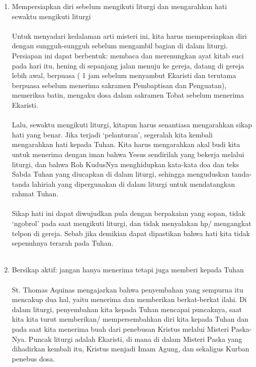 \begin{enumerate}[label=\textbf{Langkah \arabic*}]
\item Mempersiapkan diri sebelum mengikuti liturgi dan mengarahkan hati sewaktu mengikuti liturgi
\\{~}\\
Untuk menyadari kedalaman arti misteri ini, kita harus mempersiapkan diri dengan sungguh-sungguh sebelum mengambil bagian di dalam liturgi. Persiapan ini dapat berbentuk: membaca dan merenungkan ayat kitab suci pada hari itu, hening di sepanjang jalan menuju ke gereja, datang di gereja lebih awal, berpuasa ( 1 jam sebelum menyambut Ekaristi dan terutama berpuasa sebelum menerima sakramen Pembaptisan dan Penguatan), memeriksa batin, mengaku dosa dalam sakramen Tobat sebelum menerima Ekaristi.
\\{~}\\
Lalu, sewaktu mengikuti liturgi, kitapun harus senantiasa mengarahkan sikap hati yang benar. Jika terjadi ‘pelanturan’, segeralah kita kembali mengarahkan hati kepada Tuhan. Kita harus mengarahkan akal budi kita untuk menerima dengan iman bahwa Yesus sendirilah yang bekerja melalui liturgi, dan bahwa Roh KudusNya menghidupkan kata-kata doa dan teks Sabda Tuhan yang diucapkan di dalam liturgi, sehingga menguduskan tanda-tanda lahiriah yang dipergunakan di dalam liturgi untuk mendatangkan rahmat Tuhan.
\\{~}\\
Sikap hati ini dapat diwujudkan pula dengan berpakaian yang sopan, tidak ‘ngobrol’ pada saat mengikuti liturgi, dan tidak menyalakan hp/ mengangkat telpon di gereja. Sebab jika demikian dapat dipastikan bahwa hati kita tidak sepenuhnya terarah pada Tuhan.
\\{~}\\
\item Bersikap aktif: jangan hanya menerima tetapi juga memberi kepada Tuhan
\\{~}\\
St. Thomas Aquinas mengajarkan bahwa penyembahan yang sempurna itu mencakup dua hal, yaitu menerima dan memberikan berkat-berkat ilahi. Di dalam liturgi, penyembahan kita kepada Tuhan mencapai puncaknya, saat kita kita turut memberikan/ mempersembahkan diri kita kepada Tuhan dan pada saat kita menerima buah dari penebusan Kristus melalui Misteri Paska-Nya. Puncak liturgi adalah Ekaristi, di mana di dalam Misteri Paska yang dihadirkan kembali itu, Kristus menjadi Imam Agung, dan sekaligus Kurban penebus dosa.\\{~}\\

\end{enumerate}
